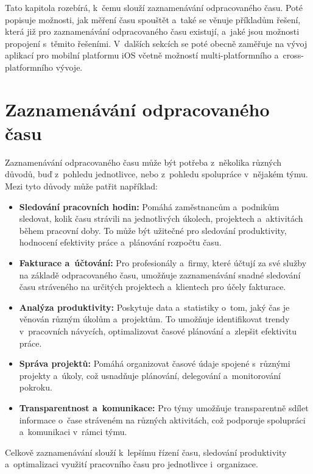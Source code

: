 Tato kapitola rozebírá, k~čemu slouží zaznamenávání odpracovaného času. Poté popisuje možnosti, jak měření času spouštět a~také se věnuje příkladům řešení, která již pro zaznamenávání odpracovaného času existují, a~jaké jsou možnosti propojení s~těmito řešeními. V~dalších sekcích se poté obecně zaměřuje na vývoj aplikací pro mobilní platformu iOS včetně možností multi-platformního a~cross-platformního vývoje.

\section{Zaznamenávání odpracovaného času}

Zaznamenávání odpracovaného času může být potřeba z~několika různých důvodů, buď z~pohledu jednotlivce, nebo z~pohledu spolupráce v~nějakém týmu. Mezi tyto důvody může patřit například:
\begin{itemize}
\item\textbf{Sledování pracovních hodin:} Pomáhá zaměstnancům a~podnikům sledovat, kolik času strávili na jednotlivých úkolech, projektech a~aktivitách během pracovní doby. To může být užitečné pro sledování produktivity, hodnocení efektivity práce a~plánování rozpočtu času.
\item\textbf{Fakturace a~účtování:} Pro profesionály a~firmy, které účtují za své služby na základě odpracovaného času, umožňuje zaznamenávání snadné sledování času stráveného na určitých projektech a~klientech pro účely fakturace.
\item\textbf{Analýza produktivity:} Poskytuje data a~statistiky o~tom, jaký čas je věnován různým úkolům a~projektům. To umožňuje identifikovat trendy v~pracovních návycích, optimalizovat časové plánování a~zlepšit efektivitu práce.
\item\textbf{Správa projektů:} Pomáhá organizovat časové údaje spojené s~různými projekty a~úkoly, což usnadňuje plánování, delegování a~monitorování pokroku.
\item\textbf{Transparentnost a~komunikace:} Pro týmy umožňuje transparentně sdílet informace o~čase stráveném na různých aktivitách, což podporuje spolupráci a~komunikaci v~rámci týmu.
\end{itemize}

Celkově zaznamenávání slouží k~lepšímu řízení času, sledování produktivity a~optimalizaci využití pracovního času pro jednotlivce i~organizace.

